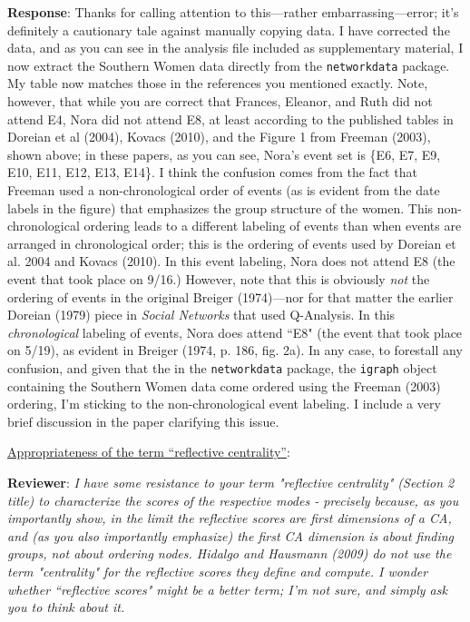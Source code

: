\documentclass{article}
\begin{document}
\textbf{Response}: Thanks for calling attention to this---rather embarrassing---error; it's definitely a cautionary tale against manually copying data. I have corrected the data, and as you can see in the analysis file included as supplementary material, I now extract the Southern Women data directly from the \texttt{networkdata} package. My table now matches those in the references you mentioned exactly. Note, however, that while you are correct that Frances, Eleanor, and Ruth did not attend E4, Nora did not attend E8, at least according to the published tables in Doreian et al (2004), Kovacs (2010), and the Figure 1 from Freeman (2003), shown above; in these papers, as you can see, Nora's event set is \{E6, E7, E9, E10, E11, E12, E13, E14\}. I think the confusion comes from the fact that Freeman used a non-chronological order of events (as is evident from the date labels in the figure) that emphasizes the group structure of the women. This non-chronological ordering leads to a different labeling of events than when events are arranged in chronological order; this is the ordering of events used by Doreian et al. 2004 and Kovacs (2010). In this event labeling, Nora does not attend E8 (the event that took place on 9/16.) However, note that this is obviously \textit{not} the ordering of events in the original Breiger (1974)---nor for that matter the earlier Doreian (1979) piece in \textit{Social Networks} that used Q-Analysis. In this \textit{chronological} labeling of events, Nora does attend ``E8" (the event that took place on 5/19), as evident in Breiger (1974, p. 186, fig. 2a). In any case, to forestall any confusion, and given that the in the \texttt{networkdata} package, the \texttt{igraph} object containing the Southern Women data come ordered using the Freeman (2003) ordering, I'm sticking to the non-chronological event labeling. I include a very brief discussion in the paper clarifying this issue. 



\underline{Appropriateness of the term ``reflective centrality''}:

\textbf{Reviewer}: \textit{I have some resistance to your term "reflective centrality" (Section 2 title) to characterize the scores of the respective modes - precisely because, as you importantly show, in the limit the reflective scores are first dimensions of a CA, and (as you also importantly emphasize) the first CA dimension is about finding groups, not about ordering nodes. Hidalgo and Hausmann (2009) do not use the term "centrality" for the reflective scores they define and compute. I wonder whether ``reflective scores" might be a better term; I'm not sure, and simply ask you to think about it.}
\end{document}

